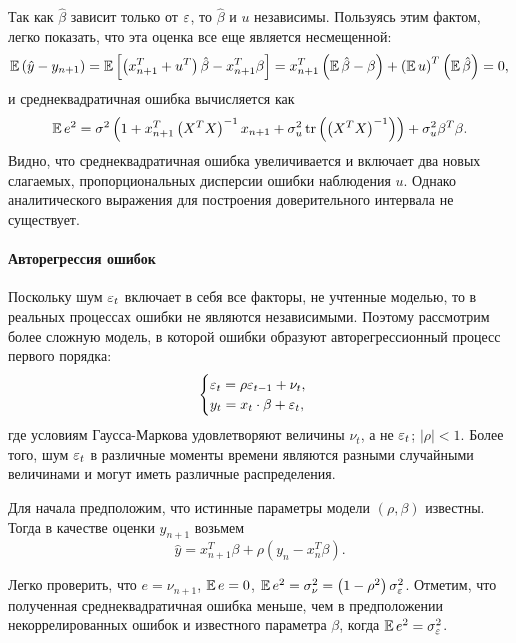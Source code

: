 Так как $\hat\beta$ зависит только от $\varepsilon$, то $\hat\beta$ и $u$ независимы. Пользуясь этим фактом, легко показать, что эта оценка все еще является несмещенной:
\begin{equation*}
    \operatorname{\mathbb{E}}\left( \hat{y} - y_{n+1} \right) =
    \operatorname{\mathbb{E}}\left[\left( x_{n+1}^T + u^T \right) \hat\beta - x_{n+1}^T \beta \right] =
    x_{n+1}^T \left( \operatorname{\mathbb{E}}\hat\beta - \beta \right) + \left( \operatorname{\mathbb{E}} u \right)^T \left( \operatorname{\mathbb{E}}\hat\beta \right) =
    0,
\end{equation*}
и среднеквадратичная ошибка вычисляется как
\begin{equation*}
    \operatorname{\mathbb{E}} e^2 = \sigma^2 \left( 1 + x_{n+1}^T \left( X^T X \right)^{-1} x_{n+1} + \sigma_u^2 \operatorname{tr} \left( \left( X^T X \right)^{-1} \right) \right) + \sigma_u^2 \beta^T \beta.
\end{equation*}
Видно, что среднеквадратичная ошибка увеличивается и включает два новых слагаемых, пропорциональных дисперсии ошибки наблюдения $u$.
Однако аналитического выражения для построения доверительного интервала не существует.


\paragraph{Авторегрессия ошибок}
Поскольку шум $\varepsilon_t$ включает в себя все факторы, не учтенные моделью, то в реальных процессах ошибки не являются независимыми.
Поэтому рассмотрим более сложную модель, в которой ошибки образуют авторегрессионный процесс первого порядка:
\begin{equation*}
    \begin{cases}
        \varepsilon_t = \rho \varepsilon_{t-1} + \nu_t,\\
        y_t = x_t \cdot \beta + \varepsilon_t,
    \end{cases}
\end{equation*}
где условиям Гаусса-Маркова удовлетворяют величины $\nu_t$, а не $\varepsilon_t$; $|\rho| < 1$.
Более того, шум $\varepsilon_t$ в различные моменты времени являются разными случайными величинами и могут иметь различные распределения.

Для начала предположим, что истинные параметры модели $\left( \rho, \beta \right)$ известны.
Тогда в качестве оценки $y_{n+1}$ возьмем
\begin{equation}
\label{11_1}
    \hat{y} =
    x_{n+1}^T \beta + \rho \left( y_n - x_n^T \beta \right).
\end{equation}

Легко проверить, что $e = \nu_{n+1}$, $\operatorname{\mathbb{E}} e = 0$, $\operatorname{\mathbb{E}} e^2 = \sigma_\nu^2 = \left( 1 - \rho^2 \right) \sigma_\varepsilon^2$.
Отметим, что полученная среднеквадратичная ошибка меньше, чем в предположении некоррелированных ошибок и известного параметра $\beta$, когда $\operatorname{\mathbb{E}} e^2 = \sigma_\varepsilon^2$.


